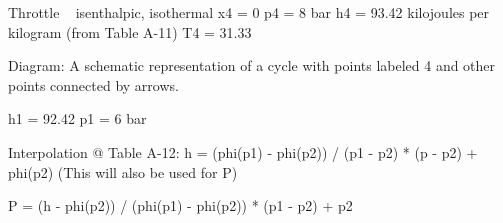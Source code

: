 Throttle ~ isenthalpic, isothermal  
x4 = 0  
p4 = 8 bar  
h4 = 93.42 kilojoules per kilogram (from Table A-11)  
T4 = 31.33  

Diagram: A schematic representation of a cycle with points labeled 4 and other points connected by arrows.  

h1 = 92.42  
p1 = 6 bar  

Interpolation @ Table A-12:  
h = (phi(p1) - phi(p2)) / (p1 - p2) * (p - p2) + phi(p2)  
(This will also be used for P)  

P = (h - phi(p2)) / (phi(p1) - phi(p2)) * (p1 - p2) + p2